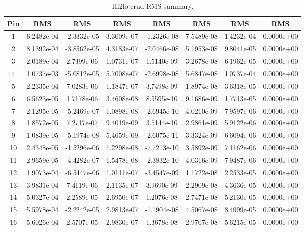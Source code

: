 \begin{table}[h]
    \begin{center}
        \caption[Hi2lo crud RMS summary.]{Hi2lo crud RMS summary.}
    \begin{tabular}[h]{|c|c|c|c|c|c|c|c|}
        \hline
Pin  & RMS & RMS & RMS & RMS & RMS & RMS & RMS \\
\hline
1  & 6.2482e-04 & -2.3332e-05 & 3.3009e-07 & -1.2326e-08 & 7.5489e-08 & 1.4232e-04 & 0.0000e+00 \\
2  & 8.1392e-04 & -3.8562e-05 & 4.3183e-07 & -2.0466e-08 & 5.1953e-08 & 9.8041e-05 & 0.0000e+00 \\
3  & 2.0189e-04 & 2.7399e-06 & 1.0731e-07 & 1.5140e-09 & 3.2678e-08 & 6.1962e-05 & 0.0000e+00 \\
4  & 1.0737e-03 & -5.0812e-05 & 5.7008e-07 & -2.6998e-08 & 5.6847e-08 & 1.0737e-04 & 0.0000e+00 \\
5  & 2.2335e-04 & 7.0283e-06 & 1.1847e-07 & 3.7498e-09 & 1.8974e-08 & 3.6318e-05 & 0.0000e+00 \\
6  & 6.5623e-05 & 1.7178e-06 & 3.4608e-08 & 8.9595e-10 & 9.1686e-09 & 1.7713e-05 & 0.0000e+00 \\
7  & 2.1295e-05 & -5.2469e-07 & 1.0898e-08 & -2.6945e-10 & 4.0210e-09 & 7.9597e-06 & 0.0000e+00 \\
8  & 1.8572e-05 & 7.2717e-07 & 9.4019e-09 & 3.6144e-10 & 2.9861e-09 & 5.9122e-06 & 0.0000e+00 \\
9  & 1.0839e-05 & -5.1974e-08 & 5.4659e-09 & -2.6075e-11 & 3.3324e-09 & 6.6094e-06 & 0.0000e+00 \\
10  & 2.4348e-05 & -1.5296e-06 & 1.2298e-08 & -7.7213e-10 & 3.5892e-09 & 7.1162e-06 & 0.0000e+00 \\
11  & 2.9659e-05 & -4.4282e-07 & 1.5478e-08 & -2.3832e-10 & 4.0316e-09 & 7.9487e-06 & 0.0000e+00 \\
12  & 1.9073e-04 & -6.5447e-06 & 1.0111e-07 & -3.4547e-09 & 1.1722e-08 & 2.2533e-05 & 0.0000e+00 \\
13  & 3.9831e-04 & 7.4119e-06 & 2.1135e-07 & 3.9690e-09 & 2.2909e-08 & 4.3636e-05 & 0.0000e+00 \\
14  & 5.0327e-04 & 2.2589e-05 & 2.6950e-07 & 1.2076e-08 & 2.7471e-08 & 5.2130e-05 & 0.0000e+00 \\
15  & 5.5978e-04 & -2.2242e-05 & 2.9813e-07 & -1.1904e-08 & 4.5067e-08 & 8.4999e-05 & 0.0000e+00 \\
16  & 5.6026e-04 & 2.5707e-05 & 2.9830e-07 & 1.3678e-08 & 2.9707e-08 & 5.6215e-05 & 0.0000e+00 \\

\end{tabular}
\end{center}
\end{table}
